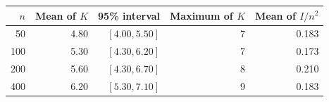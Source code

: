 \begin{tabular}{rrrrr}\toprule
	$n$ & Mean of $K$ & 95\% interval & Maximum of $K$ & Mean of $I/n^2$\\\midrule
	50 & 4.80 & $[4.00,5.50]$ & 7 & 0.183\\
	100 & 5.30 & $[4.30,6.20]$ & 7 & 0.173\\
	200 & 5.60 & $[4.30,6.70]$ & 8 & 0.210\\
	400 & 6.20 & $[5.30,7.10]$ & 9 & 0.183\\
	\bottomrule
\end{tabular}
